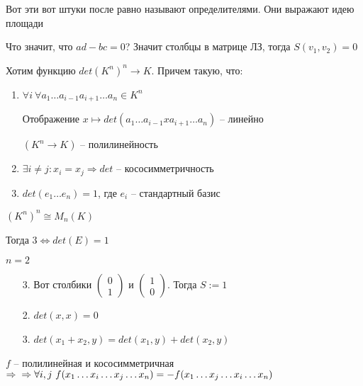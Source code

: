 \documentclass[12pt]{article}
\begin{document}
Вот эти вот штуки после равно называют определителями. Они выражают идею площади

Что значит, что $ad - bc = 0$? Значит столбцы в матрице ЛЗ, тогда $S(v_1, v_2) = 0$

Хотим функцию $det(K^n)^n \to K$. Причем такую, что:

\begin{enumerate}
    \item $\forall i\ \forall a_1 \ldots a_{i - 1} a_{i + 1} \ldots a_n \in K^n$
    
    Отображение $x \mapsto det(a_1 \ldots a_{i - 1} x a_{i + 1} \ldots a_n)$ -- линейно

    $(K^n \to K)$ -- полилинейность

    \item $\exists i \neq j : x_i = x_j \Rightarrow det$ -- кососимметричность
    \item $det(e_1 \ldots e_n) = 1$, где $e_i$ -- стандартный базис
\end{enumerate}

\begin{Remark}{}
    $(K^n)^n \cong M_n(K)$
    
    Тогда $3 \Leftrightarrow det(E) = 1$
\end{Remark}

\begin{Example}{}
    $n = 2$

    \begin{enumerate}
        \item[3.] Вот столбики $\begin{pmatrix}
                0 \\
                1
            \end{pmatrix}$ и $\begin{pmatrix}
                1 \\
                0
            \end{pmatrix}$. Тогда $S := 1$

        \item[2.] $det(x, x) = 0$
        \item[3.] $det(x_1 + x_2, y) = det(x_1, y) + det(x_2, y)$
    \end{enumerate}
\end{Example}

\begin{Remark}{}
    $f$ -- полилинейная и кососимметричная $\Rightarrow \\
    \Rightarrow \forall i, j\ f(x_1 \ldots x_i \ldots x_j \ldots x_n) = -f(x_1 \ldots x_j \ldots x_i \ldots x_n)$
\end{Remark}
\end{document}
